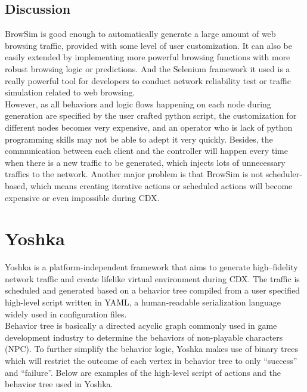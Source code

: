 \documentclass[12pt]{report}
\begin{document}
\subsection{Discussion}

BrowSim is good enough to automatically generate a large amount of web browsing traffic, provided with some level of user customization. It can also be easily extended by implementing more powerful browsing functions with more robust browsing logic or predictions. And the Selenium framework it used is a really powerful tool for developers to conduct network reliability test or traffic simulation related to web browsing.\\

However, as all behaviors and logic flows happening on each node during generation are specified by the user crafted python script, the customization for different nodes becomes very expensive, and an operator who is lack of python programming skills may not be able to adept it very quickly. Besides, the communication between each client and the controller will happen every time when there is a new traffic to be generated, which injects lots of unnecessary traffics to the network. Another major problem is that BrowSim is not scheduler-based, which means creating iterative actions or scheduled actions will become expensive or even impossible during CDX.

\section{Yoshka}

Yoshka \citep{Yoshka} is a platform-independent framework that aims to generate high--fidelity network traffic and create lifelike virtual environment during CDX. The traffic is scheduled and generated based on a behavior tree compiled from a user specified high-level script written in YAML, a human-readable serialization language widely used in configuration files.\\

Behavior tree \citep{BT1} \citep{BT2} is basically a directed acyclic graph commonly used in game development industry to determine the behaviors of non-playable characters (NPC). To further simplify the behavior logic, Yoshka makes use of binary trees which will restrict the outcome of each vertex in behavior tree to only “success” and “failure”. Below are examples of the high-level script of actions and the behavior tree used in Yoshka.\\
\end{document}
